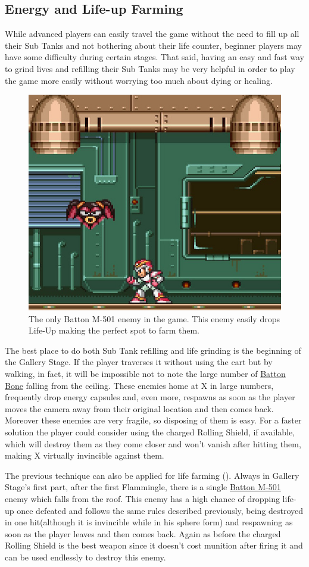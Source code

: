 \subsection{Energy and Life-up Farming}
While advanced players can easily travel the game without the need to fill up all their Sub Tanks and not bothering about their life counter, beginner players may have some difficulty during certain stages. That said, having an easy and fast way to grind lives and refilling their Sub Tanks may be very helpful in order to play the game more easily without worrying too much about dying or healing.
\begin{figure}[htp]
	\centering
	\includegraphics[width=0.5\linewidth]{figures/X1/Miscs/Farming_spot.jpg}
	\caption{The only Batton M-501 enemy in the game. This enemy easily drops Life-Up making the perfect spot to farm them.}
\end{figure}
The best place to do both Sub Tank refilling and life grinding is the beginning of the Gallery Stage. If the player traverses it without using the cart but by walking, in fact, it will be impossible not to note the large number of \hyperlink{enem:Batton_Bone}{Batton Bone}  falling from the ceiling. These enemies home at X in large numbers, frequently drop energy capsules and, even more, respawns as soon as the player moves the camera away from their original location and then comes back. Moreover these enemies are very fragile, so disposing of them is easy. For a faster solution the player could consider using the charged Rolling Shield, if available, which will destroy them as they come closer and won't vanish after hitting them, making X virtually invincible against them.

The previous technique can also be applied for life farming (). Always in Gallery Stage's first part, after the first Flammingle, there is a single \hyperlink{enem:Batton_M-501}{Batton M-501}  enemy which falls from the roof. This enemy has a high chance of dropping life-up once defeated and follows the same rules described previously, being destroyed in one hit(although it is invincible while in his sphere form) and respawning as soon as the player leaves and then comes back. Again as before the charged Rolling Shield is the best weapon since it doesn't cost munition after firing it and can be used endlessly to destroy this enemy.
